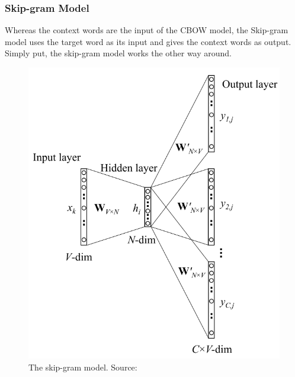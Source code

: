 \documentclass[a4paper,11pt]{article}
\begin{document}

\subsubsection{Skip-gram Model}
Whereas the context words are the input of the CBOW model, the Skip-gram model \cite{Mikolov2013b} uses the target word as its input and gives the context words as output. Simply put, the skip-gram model works the other way around.

\begin{figure}[H]
\centering
\includegraphics[width=.6\linewidth]{skip_gram.png}
\caption{The skip-gram model. Source: \cite{Rong2014word2vec}}
\label{figure:skip-gram}
\end{figure}
\end{document}
